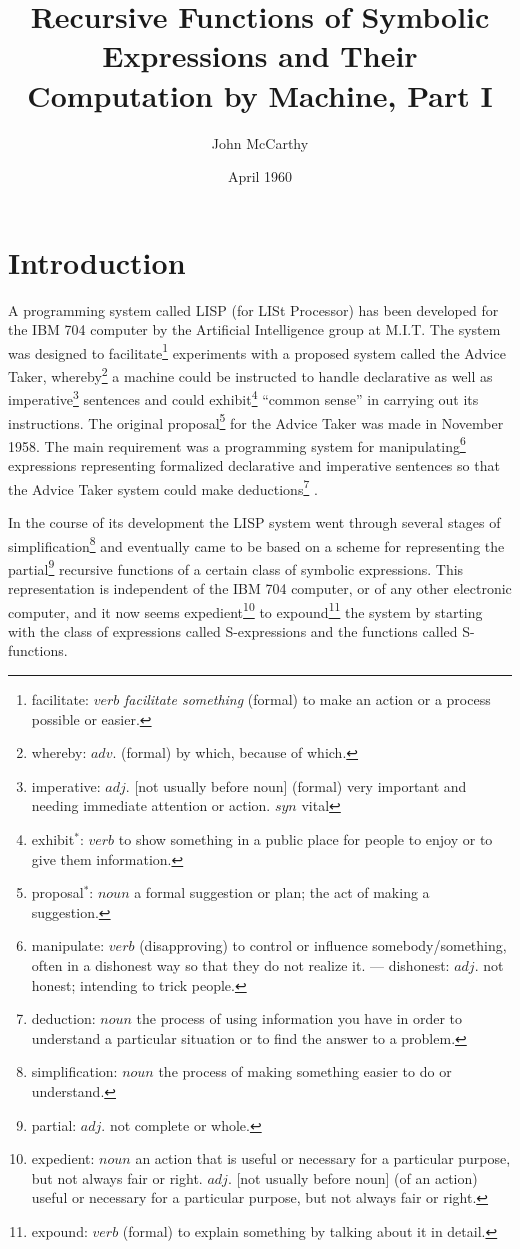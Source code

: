 \documentclass[11pt, a4paper]{article}
\title{Recursive Functions of Symbolic Expressions and Their Computation by
  Machine, Part I}
\author{John McCarthy}
\date{April 1960}
\begin{document}
\maketitle
\thispagestyle{empty}
\pagebreak

\tableofcontents
\pagebreak
{}

\section{Introduction}

A programming system called LISP (for LISt Processor) has been developed for the
IBM 704 computer by the Artificial Intelligence group at M.I.T. The system was
designed to
facilitate\footnote{facilitate: $verb$ \textit{facilitate something} (formal) to
  make an action or a process possible or easier.}
experiments with a proposed system called the Advice
Taker,
whereby\footnote{whereby: $adv.$ (formal) by which, because of which.}
a machine could be instructed to handle declarative as well as
imperative\footnote{imperative: $adj.$ [not usually before noun] (formal) very
  important and needing immediate attention or action. $syn$ vital}
sentences and could
exhibit\footnote{exhibit$^*$: $verb$ to show something in a public place for
  people to enjoy or to give them information.}
``common sense'' in carrying out its
instructions. The original
proposal\footnote{proposal$^*$: $noun$ a formal suggestion or plan; the act of
  making a suggestion.}
for the Advice Taker was made in November
1958. The main requirement was a programming system for
manipulating\footnote{manipulate: $verb$ (disapproving) to control or influence
  somebody/something, often in a dishonest way so that they do not realize
  it. --- dishonest: $adj.$ not honest; intending to trick people.}
expressions
representing formalized declarative and imperative sentences so that the Advice
Taker system could make
deductions\footnote{deduction: $noun$ the process of using information you have
  in order to understand a particular situation or to find the answer to a
  problem.}
.

In the course of its development the LISP system went through several stages of
simplification\footnote{simplification: $noun$ the process of making something
  easier to do or understand.}
and eventually came to be based on a scheme for representing the
partial\footnote{partial: $adj.$ not complete or whole.}
recursive functions of a certain class of symbolic expressions. This
representation is independent of the IBM 704 computer, or of any other
electronic computer, and it now seems
expedient\footnote{expedient: $noun$ an action that is useful or necessary for a
  particular purpose, but not always fair or right. $adj.$ [not usually before
    noun] (of an action) useful or necessary for a particular purpose, but not
  always fair or right.}
to
expound\footnote{expound: $verb$ (formal) to explain something by talking about
  it in detail.}
the system by
starting with the class of expressions called S-expressions and the functions
called S-functions.
\end{document}
